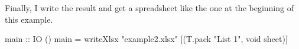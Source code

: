 Finally, I write the result and get a spreadsheet like the one at the beginning of this example.

\begin{mycode}
main :: IO ()
main = writeXlsx "example2.xlsx" [(T.pack "List 1", void sheet)]
\end{mycode}



